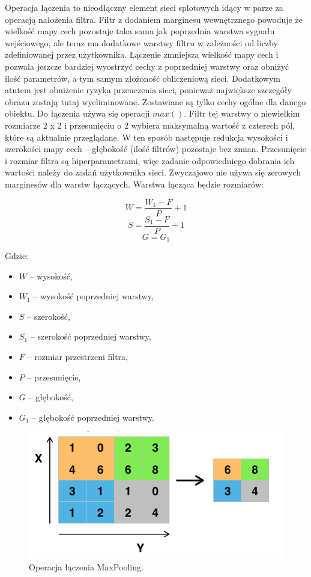 \documentclass[12pt,a4paper,twoside,titlepage,openright]{book}
\begin{document}
Operacja łączenia to nieodłączny element sieci splotowych idący w parze za operacją nałożenia filtra. Filtr z dodaniem marginesu wewnętrznego  powoduje że wielkość mapy cech pozostaje taka sama jak poprzednia warstwa sygnału wejściowego, ale teraz ma dodatkowe warstwy filtru w zależności od liczby zdefiniowanej przez użytkownika. Łączenie zmniejsza wielkość mapy cech i pozwala jeszcze bardziej wyostrzyć cechy z poprzedniej warstwy oraz obniżyć ilość parametrów, a tym samym złożoność obliczeniową sieci. Dodatkowym atutem jest obniżenie ryzyka przeuczenia sieci, ponieważ największe szczegóły obrazu zostają tutaj wyeliminowane. Zostawiane są tylko cechy ogólne dla danego obiektu. Do łączenia używa się operacji $max()$. Filtr tej warstwy o niewielkim rozmiarze 2 x 2 i przesunięciu o \(2\) wybiera maksymalną wartość z czterech pól, które są aktualnie przeglądane. W ten sposób następuje redukcja wysokości i szerokości mapy cech -- głębokość (ilość filtrów) pozostaje  bez zmian. Przesunięcie i rozmiar filtra są hiperparametrami, więc zadanie odpowiedniego dobrania ich wartości należy do zadań użytkownika sieci. Zwyczajowo nie używa się zerowych marginesów dla warstw łączących. Warstwa łącząca będzie rozmiarów:

$$ W = \frac{W_1 - F}{P} + 1 $$
$$ S = \frac{S_1 - F}{P} + 1 $$
$$ G = G_1 $$

Gdzie:
\begin{itemize}
\item $W$ -- wysokość,
\item $W_1$ -- wysokość poprzedniej warstwy,
\item $S$ -- szerokość,
\item $S_1$ -- szerokość poprzedniej warstwy,
\item $F$ -- rozmiar przestrzeni filtra,
\item $P$ -- przesunięcie,
\item $G$ -- głębokość,
\item $G_1$ -- głębokość poprzedniej warstwy.
\end{itemize}

\begin{figure}[ht]
	\centering
			\includegraphics[resolution=100, scale=0.6]{MaxPooling.png}
		\caption{Operacja łączenia MaxPooling.}
\end{figure}
\end{document}
